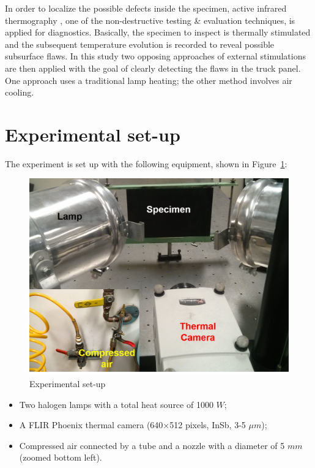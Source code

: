 \documentclass{tQRT2e}
\begin{document}
In order to localize the possible defects inside the specimen, active infrared thermography \cite{Maldague2001theory,Balageas2016}, one of the non-destructive testing \& evaluation techniques, is applied for diagnostics. Basically, the specimen to inspect is thermally stimulated and the subsequent temperature evolution is recorded to reveal possible subsurface ﬂaws. In this study two opposing approaches of external stimulations are then applied with the goal of clearly detecting the flaws in the truck panel. One approach uses a traditional lamp heating; the other method involves air cooling. 


\section{Experimental set-up}
The experiment is set up with the following equipment, shown in Figure~\ref{Exp}:
\begin{figure}
	\centering
	\includegraphics[scale=0.5]{Exp}
	\caption{Experimental set-up}
	\label{Exp}
\end{figure}

\begin{itemize}
  \item Two halogen lamps with a total heat source of 1000 $W$;
  \item A FLIR Phoenix thermal camera (640×512 pixels, InSb, 3-5 $\mu m$);
  \item Compressed air connected by a tube and a nozzle with a diameter of 5 $mm$ (zoomed bottom left).
\end{itemize}
\end{document}
